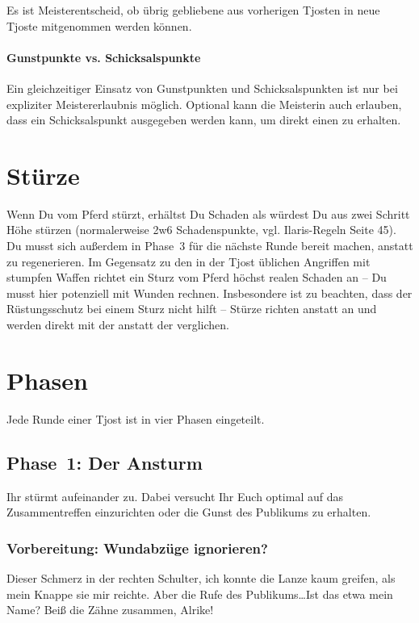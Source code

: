 \documentclass[12pt,div=calc,a5paper,parskip=half]{scrartcl}
\begin{document}
Es ist Meisterentscheid, ob übrig gebliebene \gp aus vorherigen Tjosten in neue Tjoste mitgenommen werden können. 

\paragraph{Gunstpunkte vs. Schicksalspunkte} Ein gleichzeitiger Einsatz von Gunstpunkten und Schicksalspunkten ist nur bei expliziter Meistererlaubnis möglich. Optional kann die Meisterin auch erlauben, dass ein Schicksalspunkt ausgegeben werden kann, um direkt einen \gp zu erhalten. 

\section{Stürze}

Wenn Du vom Pferd stürzt, erhältst Du Schaden als würdest Du aus zwei Schritt Höhe stürzen (normalerweise 2w6 Schadenspunkte, vgl. Ilaris-Regeln Seite 45). Du musst sich außerdem in Phase~3 für die nächste Runde bereit machen, anstatt zu regenerieren. Im Gegensatz zu den in der Tjost üblichen Angriffen mit stumpfen Waffen richtet ein Sturz vom Pferd höchst realen Schaden an -- Du musst hier potenziell mit Wunden rechnen. Insbesondere ist zu beachten, dass der Rüstungsschutz bei einem Sturz nicht hilft -- Stürze richten  anstatt  an und werden direkt mit der  anstatt der  verglichen. 

\section{Phasen}
Jede Runde einer Tjost ist in vier Phasen eingeteilt. 

\subsection{Phase~1: Der Ansturm}

\begin{desc}
    Ihr stürmt aufeinander zu. Dabei versucht Ihr Euch optimal auf das Zusammentreffen einzurichten oder die Gunst des Publikums zu erhalten. 
\end{desc}

\subsubsection{Vorbereitung: Wundabzüge ignorieren?}

\begin{desc}
Dieser Schmerz in der rechten Schulter, ich konnte die Lanze kaum greifen, als mein Knappe sie mir reichte. Aber die Rufe des Publikums\dots Ist das etwa mein Name? Beiß die Zähne zusammen, Alrike!
\end{desc}
\end{document}
